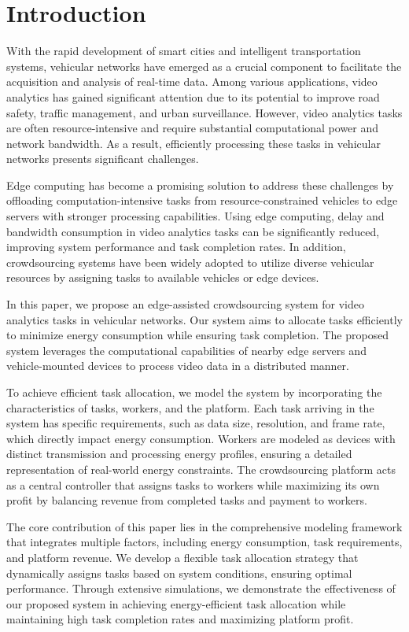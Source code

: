 \section{Introduction}
With the rapid development of smart cities and intelligent transportation systems, vehicular networks have emerged as a crucial component to facilitate the acquisition and analysis of real-time data. Among various applications, video analytics has gained significant attention due to its potential to improve road safety, traffic management, and urban surveillance. However, video analytics tasks are often resource-intensive and require substantial computational power and network bandwidth. As a result, efficiently processing these tasks in vehicular networks presents significant challenges.

Edge computing has become a promising solution to address these challenges by offloading computation-intensive tasks from resource-constrained vehicles to edge servers with stronger processing capabilities. Using edge computing, delay and bandwidth consumption in video analytics tasks can be significantly reduced, improving system performance and task completion rates. In addition, crowdsourcing systems have been widely adopted to utilize diverse vehicular resources by assigning tasks to available vehicles or edge devices.

In this paper, we propose an edge-assisted crowdsourcing system for video analytics tasks in vehicular networks. Our system aims to allocate tasks efficiently to minimize energy consumption while ensuring task completion. The proposed system leverages the computational capabilities of nearby edge servers and vehicle-mounted devices to process video data in a distributed manner.

To achieve efficient task allocation, we model the system by incorporating the characteristics of tasks, workers, and the platform. Each task arriving in the system has specific requirements, such as data size, resolution, and frame rate, which directly impact energy consumption. Workers are modeled as devices with distinct transmission and processing energy profiles, ensuring a detailed representation of real-world energy constraints. The crowdsourcing platform acts as a central controller that assigns tasks to workers while maximizing its own profit by balancing revenue from completed tasks and payment to workers.

The core contribution of this paper lies in the comprehensive modeling framework that integrates multiple factors, including energy consumption, task requirements, and platform revenue. We develop a flexible task allocation strategy that dynamically assigns tasks based on system conditions, ensuring optimal performance. Through extensive simulations, we demonstrate the effectiveness of our proposed system in achieving energy-efficient task allocation while maintaining high task completion rates and maximizing platform profit.

